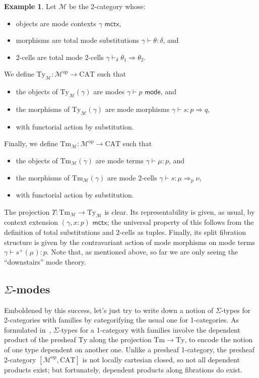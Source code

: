 \documentclass[10pt]{article}
\theoremstyle{definition}
\newtheorem{example}{Example}
\newcommand{\yields}{\vdash}
\newcommand{\tcell}{\Rightarrow}
\newcommand{\ctx}{\,\,\mathsf{mctx}}
\newcommand{\type}{\,\,\mathsf{mode}}
\newcommand\TypeTwo[4]{\ensuremath{#1 \vdash #2 :  #3 \tcell #4}}
\newcommand\TermTwoT[5]{\ensuremath{#1 \vdash {#2} : #3 \tcell_{#5} #4}}
\newcommand\TrPlus[2]{\ensuremath{{#1}^+(#2)}}
\newcommand\op{^{\mathrm{op}}}
\newcommand\CAT{\mathrm{CAT}}
\newcommand\M{\mathcal{M}}
\newcommand\Mty{{\mathrm{Ty}_{\M}}}
\newcommand\Mtm{{\mathrm{Tm}_{\M}}}
\newcommand\Ups{\Upsilon}
\begin{document}
\begin{example}\label{eg:syn-2cwf}
  Let $\M$ be the 2-category whose:
  \begin{itemize}
  \item objects are mode contexts $\gamma \ctx$,
  \item morphisms are total mode substitutions $\gamma \yields \theta : \delta$, and
  \item 2-cells are total mode 2-cells $\gamma \yields_\delta \theta_1 \tcell \theta_2$.
  \end{itemize}
  We define $\Mty:\M\op\to\CAT$ such that
  \begin{itemize}
  \item the objects of $\Mty(\gamma)$ are modes $\gamma \yields p\type$, and
  \item the morphisms of $\Mty(\gamma)$ are mode morphisms $\TypeTwo{\gamma}{s}{p}{q}$,
  \item with functorial action by substitution.
  \end{itemize}
  Finally, we define $\Mtm:\M\op\to\CAT$ such that
  \begin{itemize}
  \item the objects of $\Mtm(\gamma)$ are mode terms $\gamma \yields \mu:p$, and
  \item the morphisms of $\Mtm(\gamma)$ are mode 2-cells $\TermTwoT{\gamma}{s}{\mu}{\nu}{p}$,
  \item with functorial action by substitution.
  \end{itemize}
  The projection $\Ups:\Mtm\to\Mty$ is clear.
  Its representability is given, as usual, by context extension $(\gamma, x:p) \ctx$; the universal property of this follows from the definition of total substitutions and 2-cells as tuples.
  Finally, its split fibration structure is given by the contravariant action of mode morphisms on mode terms ${\gamma \yields \TrPlus{s}{\mu} : p}$.
  Note that, as mentioned above, so far we are only seeing the ``downstairs'' mode theory.
\end{example}


\subsection{$\Sigma$-modes}
\label{sec:2-sigmas}


Emboldened by this success, let's just try to write down a notion of $\Sigma$-types for 2-categories with families by categorifying the usual one for 1-categories.
As formulated in~\cite{awodey:natural-models}, $\Sigma$-types for a 1-category with families involve the dependent product of the presheaf $\mathrm{Ty}$ along the projection $\mathrm{Tm}\to \mathrm{Ty}$, to encode the notion of one type dependent on another one.
Unlike a presheaf 1-category, the presheaf 2-category $[\M\op,\CAT]$ is not locally cartesian closed, so not all dependent products exist; but fortunately, dependent products along fibrations do exist.
\end{document}
